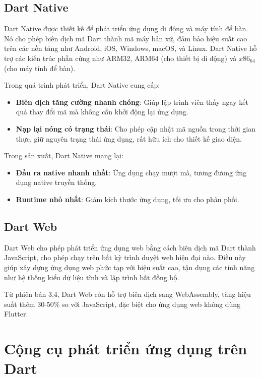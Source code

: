 \documentclass[../DoAn.tex]{subfiles}
\numberwithin{figure}{chapter}
\begin{document}
\subsection{Dart Native}

Dart Native được thiết kế để phát triển ứng dụng di động và máy tính để bàn. Nó cho phép biên dịch mã Dart thành mã máy bản xứ, đảm bảo hiệu suất cao trên các nền tảng như Android, iOS, Windows, macOS, và Linux. Dart Native hỗ trợ các kiến trúc phần cứng như ARM32, ARM64 (cho thiết bị di động) và $x86_64$ (cho máy tính để bàn).

Trong quá trình phát triển, Dart Native cung cấp:
\begin{itemize}
    \item \textbf{Biên dịch tăng cường nhanh chóng}: Giúp lập trình viên thấy ngay kết quả thay đổi mã mà không cần khởi động lại ứng dụng.
    \item \textbf{Nạp lại nóng có trạng thái}: Cho phép cập nhật mã nguồn trong thời gian thực, giữ nguyên trạng thái ứng dụng, rất hữu ích cho thiết kế giao diện.
\end{itemize}

Trong sản xuất, Dart Native mang lại:
\begin{itemize}
    \item \textbf{Đầu ra native nhanh nhất}: Ứng dụng chạy mượt mà, tương đương ứng dụng native truyền thống.
    \item \textbf{Runtime nhỏ nhất}: Giảm kích thước ứng dụng, tối ưu cho phân phối.
\end{itemize}

\subsection{Dart Web}

Dart Web cho phép phát triển ứng dụng web bằng cách biên dịch mã Dart thành JavaScript, cho phép chạy trên bất kỳ trình duyệt web hiện đại nào. Điều này giúp xây dựng ứng dụng web phức tạp với hiệu suất cao, tận dụng các tính năng như hệ thống kiểu dữ liệu tĩnh và lập trình bất đồng bộ.

Từ phiên bản 3.4, Dart Web còn hỗ trợ biên dịch sang WebAssembly, tăng hiệu suất thêm 30-50\% so với JavaScript, đặc biệt cho ứng dụng web không dùng Flutter.

\section{Cộng cụ phát triển ứng dụng trên Dart}
\end{document}

